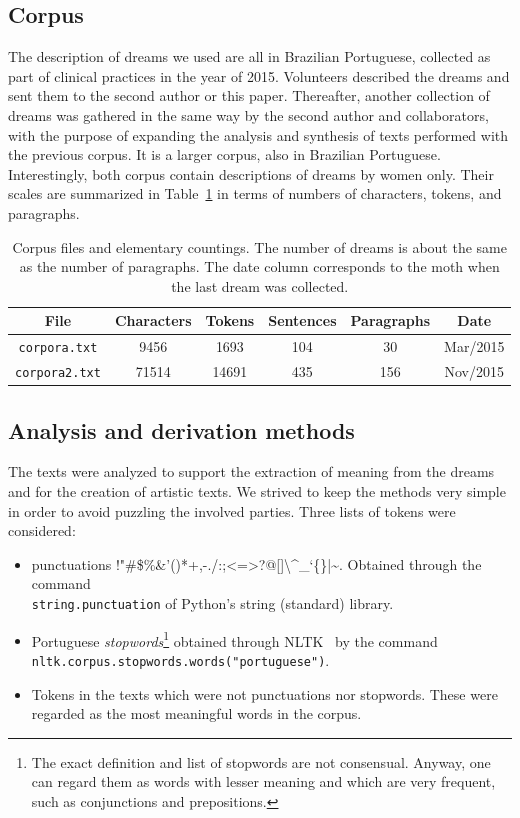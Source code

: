 \documentclass[12pt,fleqn]{article}
\begin{document}
\subsection{Corpus}
The description of dreams we used are all in Brazilian Portuguese,
collected as part of clinical practices in the year of 2015.
Volunteers described the dreams and sent them to the second author or this paper.
Thereafter, another collection of dreams was gathered in the same way by the second author and collaborators,
with the purpose of expanding the analysis and synthesis of texts performed with the previous
corpus.
It is a larger corpus, also in Brazilian Portuguese.
Interestingly, both corpus contain descriptions of dreams by women only.
Their scales are summarized in Table~\ref{tab:dreams} in terms of numbers of characters, tokens,
and paragraphs.

\begin{table}[H] %
	\caption{Corpus files and elementary countings.
	The number of dreams is about the same as the number of paragraphs.
	The date column corresponds to  the moth when the last dream was collected.}\label{tab:dreams}
\vspace{12pt}
\centering{}
	\begin{tabular}{  c || c | c | c | c | c }
		\textbf{File}           & \textbf{Characters} & \textbf{Tokens} & \textbf{Sentences} & \textbf{Paragraphs} & \textbf{Date} \\\hline
		\texttt{corpora.txt}  & 9456 & 1693 & 104 & 30 & Mar/2015 \\
		\texttt{corpora2.txt}  & 71514 & 14691 & 435 & 156 & Nov/2015 \\
\end{tabular}
\end{table}

\subsection{Analysis and derivation methods}
The texts were analyzed to support the extraction of meaning from the dreams
and for the creation of artistic texts.
We strived to keep the methods very simple in order to avoid puzzling the involved parties.
Three lists of tokens were considered:
\begin{itemize}
	\item punctuations !"\#\$\%\&'()*+,-./:;<=>?@[]\textbackslash\textasciicircum\_`\{\}|\textasciitilde. Obtained through the command \\ \texttt{string.punctuation} of Python's string (standard) library.
	\item Portuguese \emph{stopwords}\footnote{The exact definition and list of stopwords are not consensual.
		Anyway, one can regard them as words with lesser meaning and which are very frequent, such as conjunctions and prepositions.}
		obtained through NLTK~\citep{nltk} by the command \\ \texttt{nltk.corpus.stopwords.words("portuguese")}.
	\item Tokens in the texts which were not punctuations nor stopwords.
		These were regarded as the most meaningful words in the corpus.
\end{itemize}
\end{document}
